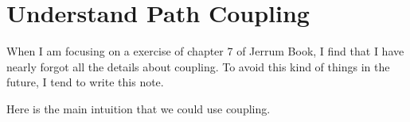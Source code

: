 \section{Understand Path Coupling}
When I am focusing on a exercise of chapter 7 of Jerrum Book,
I find that I have nearly forgot all the details about coupling.
To avoid this kind of things in the future, I tend to write this note.

Here is the main intuition that we could use coupling.
\begin{lemma}
\end{lemma}

